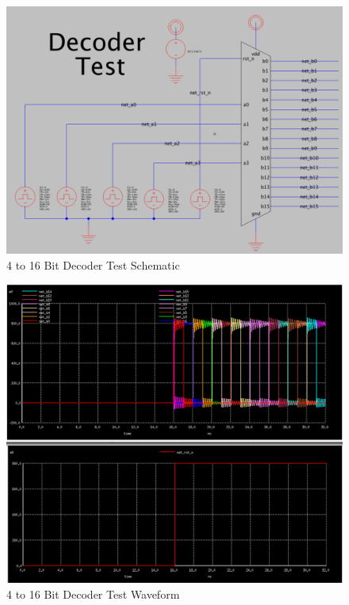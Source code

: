 \documentclass[a4paper]{article}
\begin{document}
\begin{figure}[H]
	\centering
	\includegraphics[scale=0.3]{decoderTestWithResetSchematic}
	\caption{4 to 16 Bit Decoder Test Schematic}
	\label{fig:decoderTestWithResetSchematic}
\end{figure}

\begin{figure}[H]
	\centering
	\includegraphics[scale=0.3]{decoderTestWithResetWaveform}
	\caption{4 to 16 Bit Decoder Test Waveform}
	\label{fig:decoderTestWithResetWaveform}
\end{figure}
\end{document}
